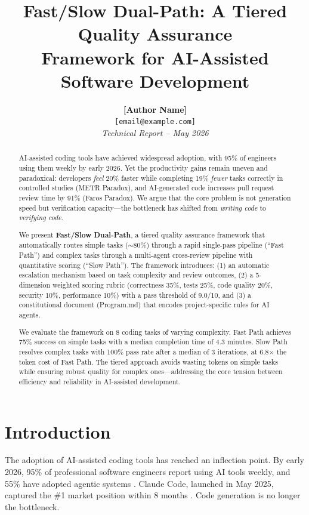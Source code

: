 \documentclass[11pt,a4paper]{article}
\title{Fast/Slow Dual-Path: A Tiered Quality Assurance\\Framework for AI-Assisted Software Development}
\author{
  \textbf{[Author Name]} \\
  \texttt{[email@example.com]} \\
  \vspace{0.3cm}
  \textit{Technical Report -- May 2026}
}
\date{}
\begin{document}
\maketitle

\begin{abstract}
AI-assisted coding tools have achieved widespread adoption, with 95\% of engineers using them weekly by early 2026. Yet the productivity gains remain uneven and paradoxical: developers \textit{feel} 20\% faster while completing 19\% \textit{fewer} tasks correctly in controlled studies (METR Paradox), and AI-generated code increases pull request review time by 91\% (Faros Paradox). We argue that the core problem is not generation speed but verification capacity---the bottleneck has shifted from \textit{writing code} to \textit{verifying code}. 

We present \textbf{Fast/Slow Dual-Path}, a tiered quality assurance framework that automatically routes simple tasks ($\sim$80\%) through a rapid single-pass pipeline (``Fast Path'') and complex tasks through a multi-agent cross-review pipeline with quantitative scoring (``Slow Path''). The framework introduces: (1) an automatic escalation mechanism based on task complexity and review outcomes, (2) a 5-dimension weighted scoring rubric (correctness 35\%, tests 25\%, code quality 20\%, security 10\%, performance 10\%) with a pass threshold of 9.0/10, and (3) a constitutional document (Program.md) that encodes project-specific rules for AI agents. 

We evaluate the framework on 8 coding tasks of varying complexity. Fast Path achieves 75\% success on simple tasks with a median completion time of 4.3 minutes. Slow Path resolves complex tasks with 100\% pass rate after a median of 3 iterations, at 6.8$\times$ the token cost of Fast Path. The tiered approach avoids wasting tokens on simple tasks while ensuring robust quality for complex ones---addressing the core tension between efficiency and reliability in AI-assisted development.
\end{abstract}

\section{Introduction}

The adoption of AI-assisted coding tools has reached an inflection point. By early 2026, 95\% of professional software engineers report using AI tools weekly, and 55\% have adopted agentic systems \cite{djimit2026}. Claude Code, launched in May 2025, captured the \#1 market position within 8 months \cite{djimit2026}. Code generation is no longer the bottleneck.
\end{document}
